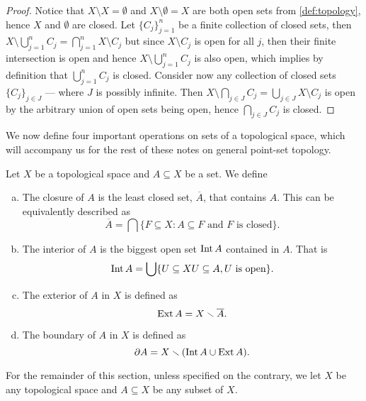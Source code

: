 \begin{proof}
Notice that \(X \setminus X = \emptyset\) and \(X \setminus \emptyset = X\) are
both open sets from \cref{def:topology}, hence \(X\) and \(\emptyset\) are
closed. Let \(\{C_{j}\}_{j=1}^n\) be a finite collection of closed sets, then
\(X \setminus \bigcup_{j=1}^n C_j = \bigcap_{j=1}^n X \setminus C_j\) but since
\(X \setminus C_j\) is open for all \(j\), then their finite intersection is
open and hence \(X \setminus \bigcup_{j=1}^n C_j\) is also open, which implies
by definition that \(\bigcup_{j=1}^n C_j\) is closed. Consider now any
collection of closed sets \(\{C_{j}\}_{j \in J}\) --- where \(J\) is possibly
infinite. Then \(X \setminus \bigcap_{j \in J} C_j = \bigcup_{j \in J} X
\setminus C_j\) is open by the arbitrary union of open sets being open, hence
\(\bigcap_{j \in J} C_j\) is closed.
\end{proof}

We now define four important operations on sets of a topological space, which
will accompany us for the rest of these notes on general point-set topology.

\begin{definition}
Let \(X\) be a topological space and \(A \subseteq X\) be a set. We define
\begin{enumerate}[(a)]\setlength\itemsep{0em}
\item\label{def: closure}
  The closure of \(A\) is the least closed set, \(\overline A\), that
  contains \(A\). This can be equivalently described as
  \[
    \overline A = \bigcap \{F \subseteq X \colon A \subseteq F \text{ and } F
    \text{ is closed}\}.
  \]

\item\label{def: interior}
  The interior of \(A\) is the biggest open set \(\operatorname{Int} A\) contained in
  \(A\). That is
    \[
      \operatorname{Int} A = \bigcup \{U \subseteq X \relax U \subseteq A, U \text{ is open}\}.
  \]

\item\label{def: exterior}
  The exterior of \(A\) in \(X\) is defined as
  \[
    \operatorname{Ext} A = X \smallsetminus \overline A.
  \]

\item\label{def: boundary}
  The boundary of \(A\) in \(X\) is defined as
  \[
    \partial A = X \smallsetminus (\operatorname{Int} A \cup \operatorname{Ext} A).
  \]
\end{enumerate}
\end{definition}

\begin{remark}
For the remainder of this section, unless specified on the contrary, we let
\(X\) be any topological space and \(A \subseteq X\) be any subset of \(X\).
\end{remark}

